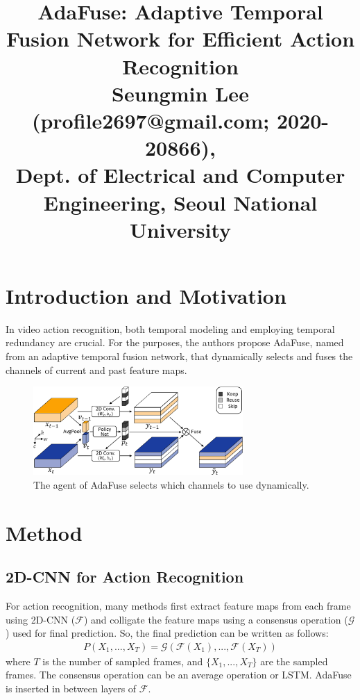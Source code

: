 \documentclass[10pt,twocolumn,letterpaper]{article}
\begin{document}
\title{AdaFuse: Adaptive Temporal Fusion Network for Efficient Action Recognition\\ {\rm {\normalsize Seungmin Lee (profile2697@gmail.com; 2020-20866), \\Dept. of Electrical and Computer Engineering, Seoul National University}}}   %

\maketitle
\thispagestyle{empty}

\section{Introduction and Motivation}
In video action recognition, both temporal modeling and employing temporal redundancy are crucial. For the purposes, the authors propose AdaFuse, named from an adaptive temporal fusion network, that dynamically selects and fuses the channels of current and past feature maps. 

\begin{figure}[b]
	\centering
	\includegraphics[width=8cm]{assets/shit.png}
	\caption{The agent of AdaFuse selects which channels to use dynamically.}
	\label{fig:imgs}
\end{figure}

\section{Method}
\subsection{2D-CNN for Action Recognition}
For action recognition, many methods first extract feature maps from each frame using 2D-CNN ($\mathcal{F}$) and colligate the feature maps using a consensus operation ($\mathcal{G}$) used for final prediction. So, the final prediction can be written as follows:
\begin{align*}
	P(X_1, ..., X_T) = \mathcal{G}(\mathcal{F}(X_1), ...,\mathcal{F}(X_T))
\end{align*}
where $T$ is the number of sampled frames, and $\{X_1, ..., X_T\}$ are the sampled frames. The consensus operation can be an average operation or LSTM. AdaFuse is inserted in between layers of $\mathcal{F}$.
\end{document}
